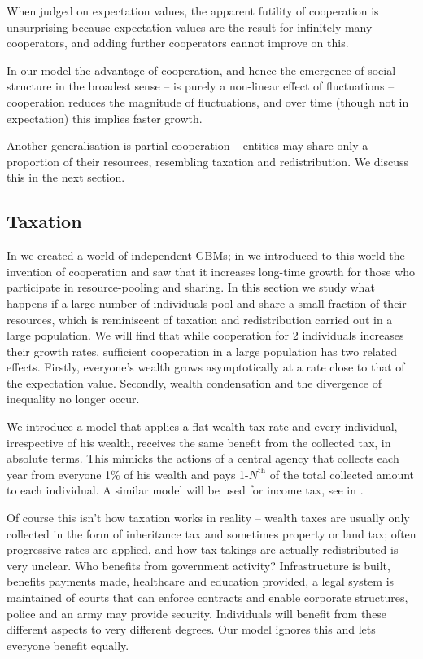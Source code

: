 When judged on expectation values, the apparent futility of cooperation is unsurprising
because expectation values are the result for infinitely 
many cooperators, and adding further cooperators cannot improve on this.

In our model the advantage of cooperation, and hence the emergence
of social structure in the broadest sense -- is purely a non-linear 
effect of fluctuations -- cooperation reduces the magnitude of 
fluctuations, and over time (though not in expectation) this implies faster growth. 


Another generalisation is partial cooperation -- entities may share only
a proportion of their resources, resembling taxation and redistribution. We discuss this in
the next section.
\FloatBarrier

\subsection{Taxation}
In  we created a world of independent GBMs; in  
we introduced to this world
the invention of cooperation and saw that it increases long-time growth for those who participate
in resource-pooling and sharing. In this section we study what happens if a large number
of individuals pool and share a small fraction of their resources, which is reminiscent of taxation
and redistribution carried out in a large population. We will find that while cooperation for 2 individuals
increases their growth rates, sufficient cooperation in a large population
has two related effects. Firstly, everyone's wealth grows asymptotically at a rate close to that of
the expectation value. Secondly, wealth condensation and the divergence of inequality 
no longer occur.

We introduce a model that applies a flat wealth tax rate and every individual, irrespective of his 
wealth, receives the same benefit from the collected tax, in absolute terms. This mimicks the
actions of a central agency that collects each year from everyone 1\% of his wealth and pays 
1-$N^\text{th}$ of the total collected amount to each individual. A similar model will be 
used for income tax, see  in . 

Of course this isn't how taxation works in reality -- wealth taxes are usually only collected in 
the form of inheritance tax and sometimes property or land tax; often progressive rates are 
applied, and how tax takings are actually redistributed is very unclear. 
Who benefits from government activity? Infrastructure is built, benefits payments made, 
healthcare and education provided, a legal system is maintained of courts that can 
enforce contracts and enable corporate structures, police and an army may provide security. 
Individuals will benefit from these different aspects to very different degrees. Our model 
ignores this and lets everyone benefit equally.

